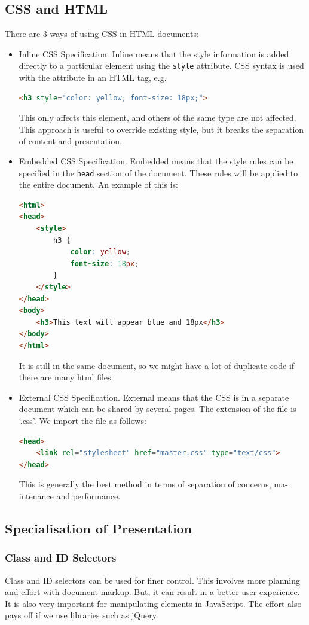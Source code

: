\documentclass[a4paper, openany]{memoir}
\begin{document}
\subsection{CSS and HTML}
There are 3 ways of using CSS in HTML documents:
\begin{itemize}
    \item Inline CSS Specification. Inline means that the style information is added directly to a particular element using the \texttt{style} attribute. CSS syntax is used with the attribute in an HTML tag, e.g.
    \begin{lstlisting}[language=html]
<h3 style="color: yellow; font-size: 18px;">\end{lstlisting}
    This only affects this element, and others of the same type are not affected. This approach is useful to override existing style, but it breaks the separation of content and presentation.
    
    \item Embedded CSS Specification. Embedded means that the style rules can be specified in the \texttt{head} section of the document. These rules will be applied to the entire document. An example of this is:
    \begin{lstlisting}[language=html]
<html>
<head>
    <style>
        h3 {
            color: yellow;
            font-size: 18px;
        }
    </style>
</head>
<body>
    <h3>This text will appear blue and 18px</h3>
</body>
</html>\end{lstlisting}
    It is still in the same document, so we might have a lot of duplicate code if there are many html files.
    
    \item External CSS Specification. External means that the CSS is in a separate document which can be shared by several pages. The extension of the file is `.css'. We import the file as follows:
    \begin{lstlisting}[language=html]
<head>
    <link rel="stylesheet" href="master.css" type="text/css">
</head>\end{lstlisting}
    This is generally the best method in terms of separation of concerns, ma-intenance and performance.
\end{itemize}

\subsection{Specialisation of Presentation}
\subsubsection{Class and ID Selectors}
Class and ID selectors can be used for finer control. This involves more planning and effort with document markup. But, it can result in a better user experience. It is also very important for manipulating elements in JavaScript. The effort also pays off if we use libraries such as jQuery.
\end{document}
